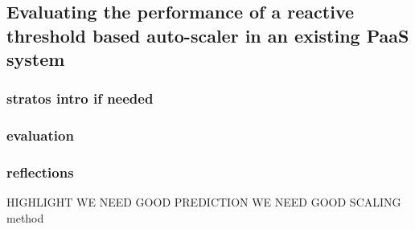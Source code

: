 \subsection{Evaluating the performance of a reactive threshold based auto-scaler in an existing PaaS system}

\subsubsection{stratos intro if needed}
\subsubsection{evaluation}



\subsubsection{reflections}

HIGHLIGHT WE NEED GOOD PREDICTION 
WE NEED GOOD SCALING method